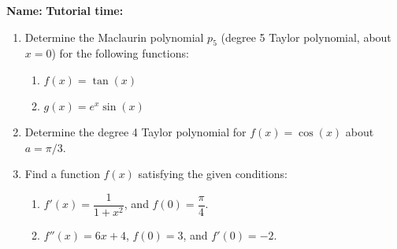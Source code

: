 \documentclass[12pt]{article}
\begin{document}
{\bf \large Name:} \hspace{2.5in} {\bf Tutorial time:}

\bigskip

\bigskip

\thispagestyle{fancy}

\begin{enumerate}
 \item Determine the Maclaurin polynomial $p_5$ (degree 5 Taylor polynomial, about $x=0$) for the following functions:
\begin{enumerate}
 \item $f(x) = \tan(x)$

\vspace{3in}

 \item $g(x) = e^x\sin(x)$

\vspace{3in}
\end{enumerate}
\newpage
 \item Determine the degree 4 Taylor polynomial for $f(x)=\cos(x)$ about $a=\pi/3$.


 \vspace{3in}

 \item Find a function $f(x)$ satisfying the given conditions:
\begin{enumerate}
 \item $f'(x) = \dfrac{1}{1+x^2}$, and $f(0)=\dfrac{\pi}{4}$.

\vspace{2in}

 \item $f''(x) = 6x+4$, $f(0)=3$, and $f'(0) = -2$.

\end{enumerate}
\end{enumerate}
\end{document}
